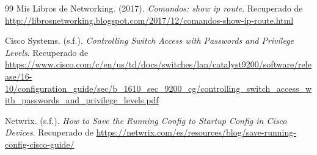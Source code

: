 \documentclass[a4paper,12pt]{article}
\begin{document}
\begin{thebibliography}{99}
    Mis Libros de Networking. (2017). \textit{Comandos: show ip route}. Recuperado de \url{http://librosnetworking.blogspot.com/2017/12/comandos-show-ip-route.html}

    Cisco Systems. (s.f.). \textit{Controlling Switch Access with Passwords and Privilege Levels}. Recuperado de \url{https://www.cisco.com/c/en/us/td/docs/switches/lan/catalyst9200/software/release/16-10/configuration_guide/sec/b_1610_sec_9200_cg/controlling_switch_access_with_passwords_and_privilege_levels.pdf}

    Netwrix. (s.f.). \textit{How to Save the Running Config to Startup Config in Cisco Devices}. Recuperado de \url{https://netwrix.com/es/resources/blog/save-running-config-cisco-guide/}

\end{thebibliography}
\end{document}
